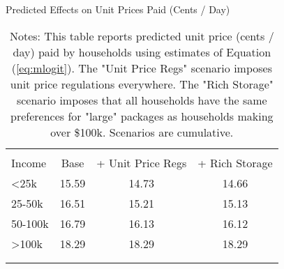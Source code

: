 \begin{table}[!htbp] \centering
\caption{Predicted Effects on Unit Prices Paid (Cents / Day)}
\label{tab:counterfactualMNLPrice}
\begin{tabular}{lccc}
\\[-1.8ex]\hline
\hline \\[-1.8ex]
Income   & Base    & + Unit Price Regs   &  + Rich Storage  \\
\hline
<25k     & 15.59   & 14.73              & 14.66 \\
25-50k   & 16.51   & 15.21              & 15.13 \\
50-100k  & 16.79   & 16.13              & 16.12 \\
>100k    & 18.29   & 18.29              & 18.29 \\
\\[-1.8ex]\hline
\hline \\[-1.8ex]
\end{tabular}
\caption*{Notes: This table reports predicted unit price (cents / day) paid by households using estimates of Equation (\ref{eq:mlogit}). The "Unit Price Regs" scenario imposes unit price regulations everywhere. The "Rich Storage" scenario imposes that all households have the same preferences for "large" packages as households making over \$100k. Scenarios are cumulative.}
\end{table}

